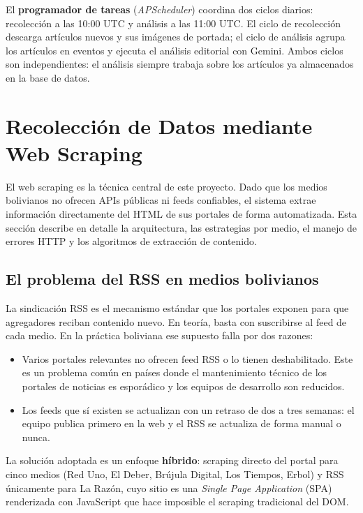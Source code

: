 \documentclass[12pt,a4paper]{article}
\begin{document}
El \textbf{programador de tareas} (\textit{APScheduler}) coordina dos ciclos diarios: recolección a las 10:00 UTC y análisis a las 11:00 UTC. El ciclo de recolección descarga artículos nuevos y sus imágenes de portada; el ciclo de análisis agrupa los artículos en eventos y ejecuta el análisis editorial con Gemini. Ambos ciclos son independientes: el análisis siempre trabaja sobre los artículos ya almacenados en la base de datos.

\section{Recolección de Datos mediante Web Scraping}

El web scraping es la técnica central de este proyecto. Dado que los medios bolivianos no ofrecen APIs públicas ni feeds confiables, el sistema extrae información directamente del HTML de sus portales de forma automatizada. Esta sección describe en detalle la arquitectura, las estrategias por medio, el manejo de errores HTTP y los algoritmos de extracción de contenido.

\subsection{El problema del RSS en medios bolivianos}

La sindicación RSS es el mecanismo estándar que los portales exponen para que agregadores reciban contenido nuevo. En teoría, basta con suscribirse al feed de cada medio. En la práctica boliviana ese supuesto falla por dos razones:

\begin{itemize}[nosep]
  \item Varios portales relevantes no ofrecen feed RSS o lo tienen deshabilitado. Este es un problema común en países donde el mantenimiento técnico de los portales de noticias es esporádico y los equipos de desarrollo son reducidos.
  \item Los feeds que sí existen se actualizan con un retraso de dos a tres semanas: el equipo publica primero en la web y el RSS se actualiza de forma manual o nunca.
\end{itemize}

La solución adoptada es un enfoque \textbf{híbrido}: scraping directo del portal para cinco medios (Red Uno, El Deber, Brújula Digital, Los Tiempos, Erbol) y RSS únicamente para La Razón, cuyo sitio es una \textit{Single Page Application} (SPA) renderizada con JavaScript que hace imposible el scraping tradicional del DOM.
\end{document}
